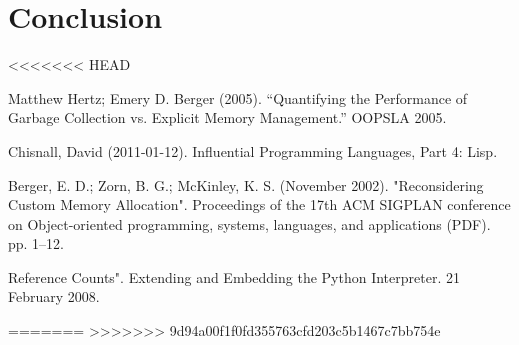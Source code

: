 \documentclass[12pt]{article}
\begin{document}
\section{Conclusion}
<<<<<<< HEAD
\newpage
\begin{thebibliography}{}
  Matthew Hertz; Emery D. Berger (2005). ``Quantifying the Performance of Garbage Collection vs. Explicit Memory Management.'' OOPSLA 2005.

  Chisnall, David (2011-01-12). Influential Programming Languages, Part 4: Lisp.
  
  Berger, E. D.; Zorn, B. G.; McKinley, K. S. (November 2002). "Reconsidering Custom Memory Allocation". Proceedings of the 17th ACM SIGPLAN conference on Object-oriented programming, systems, languages, and applications (PDF). pp. 1–12.

  Reference Counts". Extending and Embedding the Python Interpreter. 21 February 2008.
\end{thebibliography}
=======
>>>>>>> 9d94a00f1f0fd355763cfd203c5b1467c7bb754e
\end{document}
